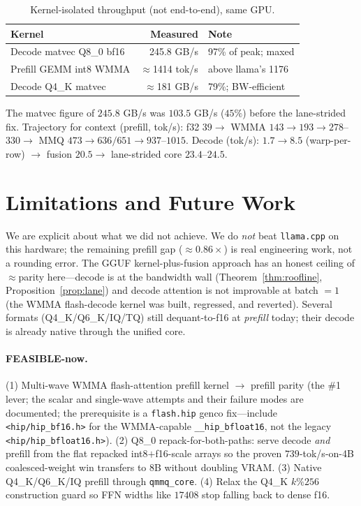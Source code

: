 \documentclass[11pt]{article}
\begin{document}
\begin{table}[h]
\centering
\caption{Kernel-isolated throughput (not end-to-end), same GPU.}
\label{tab:kernel}
\begin{tabular}{lrl}
\toprule
\textbf{Kernel} & \textbf{Measured} & \textbf{Note} \\
\midrule
Decode matvec Q8\_0 bf16 & 245.8 GB/s & 97\% of peak; maxed \\
Prefill GEMM int8 WMMA   & $\approx$1414 tok/s & above llama's 1176 \\
Decode Q4\_K matvec      & $\approx$181 GB/s & 79\%; BW-efficient \\
\bottomrule
\end{tabular}
\end{table}

The matvec figure of $245.8$ GB/s was $103.5$ GB/s ($45\%$) before the lane-strided fix. Trajectory for context (prefill, tok/s): f32 $39 \to$ WMMA $143 \to 193 \to 278$--$330 \to$ MMQ $473 \to 636/651 \to 937$--$1015$. Decode (tok/s): $1.7 \to 8.5$ (warp-per-row) $\to$ fusion $20.5 \to$ lane-strided core $23.4$--$24.5$.

\section{Limitations and Future Work}

We are explicit about what we did not achieve. We do \emph{not} beat \texttt{llama.cpp} on this hardware; the remaining prefill gap ($\approx 0.86\times$) is real engineering work, not a rounding error. The GGUF kernel-plus-fusion approach has an honest ceiling of $\approx$parity here---decode is at the bandwidth wall (Theorem~\ref{thm:roofline}, Proposition~\ref{prop:lane}) and decode attention is not improvable at batch $=1$ (the WMMA flash-decode kernel was built, regressed, and reverted). Several formats (Q4\_K/Q6\_K/IQ/TQ) still dequant-to-f16 at \emph{prefill} today; their decode is already native through the unified core.

\paragraph{FEASIBLE-now.}
(1) Multi-wave WMMA flash-attention prefill kernel $\to$ prefill parity (the \#1 lever; the scalar and single-wave attempts and their failure modes are documented; the prerequisite is a \texttt{flash.hip} genco fix---include \texttt{<hip/hip\_bf16.h>} for the WMMA-capable \texttt{\_\_hip\_bfloat16}, not the legacy \texttt{<hip/hip\_bfloat16.h>}).
(2) Q8\_0 repack-for-both-paths: serve decode \emph{and} prefill from the flat repacked int8$+$f16-scale arrays so the proven $739$-tok/s-on-4B coalesced-weight win transfers to 8B without doubling VRAM.
(3) Native Q4\_K/Q6\_K/IQ prefill through \texttt{qmmq\_core}.
(4) Relax the Q4\_K $k\%256$ construction guard so FFN widths like $17408$ stop falling back to dense f16.
\end{document}
